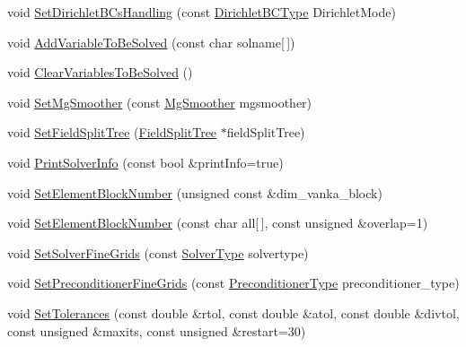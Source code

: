 \begin{DoxyCompactItemize}
\item 
void \mbox{\hyperlink{classfemus_1_1_linear_implicit_system_a19479f6fb09ab437c3e2e7116ec3cd08}{Set\+Dirichlet\+B\+Cs\+Handling}} (const \mbox{\hyperlink{_dirichlet_b_c_type_enum_8hpp_a642eeb34fa6e30051fcb1258b649e241}{Dirichlet\+B\+C\+Type}} Dirichlet\+Mode)
\item 
void \mbox{\hyperlink{classfemus_1_1_linear_implicit_system_ab0c6f96601a00ae5f20a44bd137592b8}{Add\+Variable\+To\+Be\+Solved}} (const char solname\mbox{[}$\,$\mbox{]})
\item 
void \mbox{\hyperlink{classfemus_1_1_linear_implicit_system_a71658025becd1238e92318c950792b4b}{Clear\+Variables\+To\+Be\+Solved}} ()
\item 
void \mbox{\hyperlink{classfemus_1_1_linear_implicit_system_a7ad7aa275975394d87447583dc788ca4}{Set\+Mg\+Smoother}} (const \mbox{\hyperlink{_mg_smoother_enum_8hpp_a4d11c2ff93e2f0f440c879a9c40cda71}{Mg\+Smoother}} mgsmoother)
\item 
void \mbox{\hyperlink{classfemus_1_1_linear_implicit_system_a77a2067dedf848a63091d5c10b49daff}{Set\+Field\+Split\+Tree}} (\mbox{\hyperlink{classfemus_1_1_field_split_tree}{Field\+Split\+Tree}} $\ast$field\+Split\+Tree)
\item 
void \mbox{\hyperlink{classfemus_1_1_linear_implicit_system_aaa102214a3b3df87e6e7ed2d7ecfa1a2}{Print\+Solver\+Info}} (const bool \&print\+Info=true)
\item 
void \mbox{\hyperlink{classfemus_1_1_linear_implicit_system_a9521cfdd56da0ec0bc439066ce950bb0}{Set\+Element\+Block\+Number}} (unsigned const \&dim\+\_\+vanka\+\_\+block)
\item 
void \mbox{\hyperlink{classfemus_1_1_linear_implicit_system_a3aaf2c29547bec8989c0d1a1c473126f}{Set\+Element\+Block\+Number}} (const char all\mbox{[}$\,$\mbox{]}, const unsigned \&overlap=1)
\item 
void \mbox{\hyperlink{classfemus_1_1_linear_implicit_system_ae7ac45a0d0da811a3a444529e4676146}{Set\+Solver\+Fine\+Grids}} (const \mbox{\hyperlink{_solvertype_enum_8hpp_a8b06041d7c1fb05f379714f4312306ec}{Solver\+Type}} solvertype)
\item 
void \mbox{\hyperlink{classfemus_1_1_linear_implicit_system_a82ece0f92c0ff08393eda4872c9c92ea}{Set\+Preconditioner\+Fine\+Grids}} (const \mbox{\hyperlink{_precondtype_enum_8hpp_a8b341faac6531c4543c9dc6e5e4592cf}{Preconditioner\+Type}} preconditioner\+\_\+type)
\item 
void \mbox{\hyperlink{classfemus_1_1_linear_implicit_system_abee928911384fcf422b7df9e89bd192c}{Set\+Tolerances}} (const double \&rtol, const double \&atol, const double \&divtol, const unsigned \&maxits, const unsigned \&restart=30)

\end{DoxyCompactItemize}
